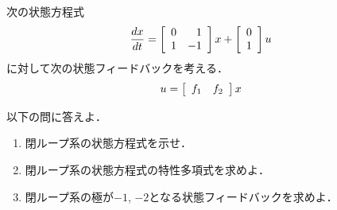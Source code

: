 \item
次の状態方程式
\begin{align}
	\frac{dx}{dt} 
	& =	\bmatrix{rr}
			0 & 1  \\
			1 & -1 
		\ematrix
		x
		+
		\bmatrix{c}
			0 \\
			1
		\ematrix
		u 
\nonumber %
\end{align}
に対して次の状態フィードバックを考える．
\begin{align}
	u & = \bmatrix{ccc} f_1 & f_2 \ematrix x
\nonumber %
\end{align}

以下の問に答えよ．
\begin{enumerate}
\item
閉ループ系の状態方程式を示せ．
\vspace{6cm}

\item
閉ループ系の状態方程式の特性多項式を求めよ．
\vspace{6cm}

\item
閉ループ系の極が$-1$, $-2$となる状態フィードバックを求めよ．

\end{enumerate}

